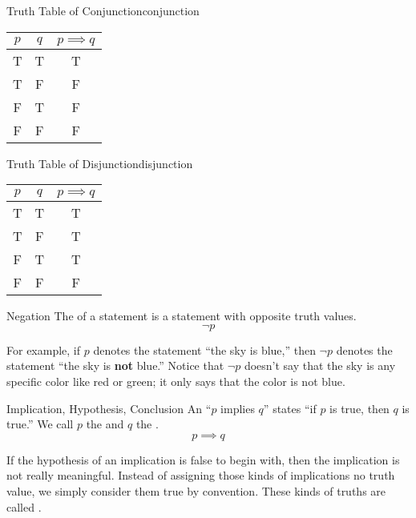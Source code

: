 \begin{exbox}{Truth Table of Conjunction}{conjunction}
    \begin{center}\begin{tabular}{c | c || c}
        $p$ & $q$ & $p \implies q$ \\ \hline
        T & T & T \\
        T & F & F \\
        F & T & F \\
        F & F & F
    \end{tabular}\end{center}
\end{exbox}

\begin{exbox}{Truth Table of Disjunction}{disjunction}
    \begin{center}\begin{tabular}{c | c || c}
        $p$ & $q$ & $p \implies q$ \\ \hline
        T & T & T \\
        T & F & T \\
        F & T & T \\
        F & F & F
    \end{tabular}\end{center}
\end{exbox}



\begin{dfnbox}{Negation}{}
    The  of a statement is a statement with opposite truth values.
    \tcblower
    \[ \neg p \]
\end{dfnbox}

For example, if $p$ denotes the statement ``the sky is blue,'' then $\neg p$ denotes the statement ``the sky is \textbf{not} blue.'' Notice that $\neg p$ doesn't say that the sky is any specific color like red or green; it only says that the color is not blue.

\begin{dfnbox}{Implication, Hypothesis, Conclusion}{}
    An  ``$p$ implies $q$'' states ``if $p$ is true, then $q$ is true.'' We call $p$ the  and $q$ the .
    \tcblower
    \[ p \implies q \]
\end{dfnbox}

If the hypothesis of an implication is false to begin with, then the implication is not really meaningful. Instead of assigning those kinds of implications no truth value, we simply consider them true by convention. These kinds of truths are called .

